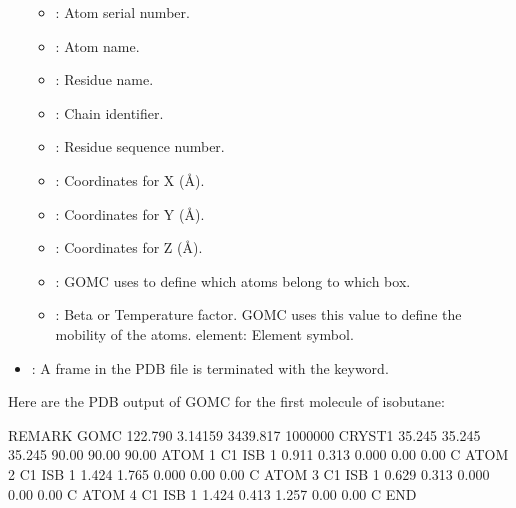 \documentclass[letterpaper,10pt,english]{sphinxmanual}
\begin{document}
\begin{itemize}
\begin{itemize}
\item {} 
: Atom serial number.

\item {} 
: Atom name.

\item {} 
: Residue name.

\item {} 
: Chain identifier.

\item {} 
: Residue sequence number.

\item {} 
: Coordinates for X (Å).

\item {} 
: Coordinates for Y (Å).

\item {} 
: Coordinates for Z (Å).

\item {} 
: GOMC uses to define which atoms belong to which box.

\item {} 
: Beta or Temperature factor. GOMC uses this value to define the mobility of the atoms. element: Element symbol.

\end{itemize}

\item {} 
:
A frame in the PDB file is terminated with the keyword.

\end{itemize}

Here are the PDB output of GOMC for the first molecule of isobutane:

\begin{sphinxVerbatim}[commandchars=\\\{\}]
REMARK    GOMC   122.790    3.14159     3439.817     1000000
CRYST1  35.245    35.245    35.245    90.00   90.00   90.00
ATOM    1     C1    ISB     1     0.911    \PYGZhy{}0.313    0.000    0.00    0.00    C
ATOM    2     C1    ISB     1     1.424    \PYGZhy{}1.765    0.000    0.00    0.00    C
ATOM    3     C1    ISB     1    \PYGZhy{}0.629    \PYGZhy{}0.313    0.000    0.00    0.00    C
ATOM    4     C1    ISB     1     1.424     0.413   \PYGZhy{}1.257    0.00    0.00    C
END
\end{sphinxVerbatim}
\end{document}
